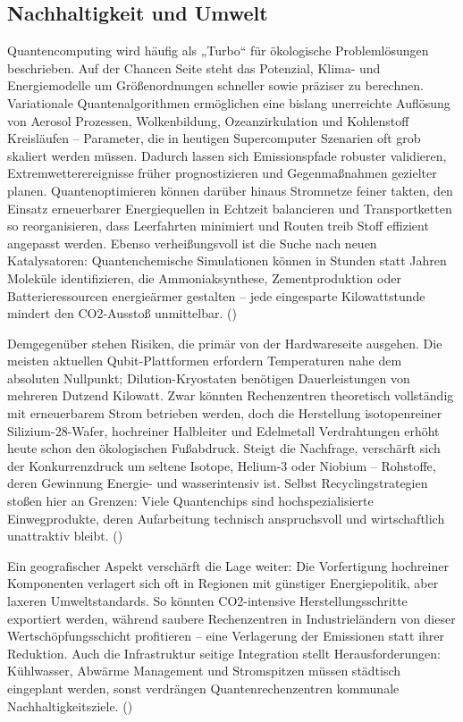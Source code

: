{\subsection{Nachhaltigkeit und Umwelt}
Quantencomputing wird häufig als „Turbo“ für ökologische Problemlösungen beschrieben. Auf der Chancen Seite steht das Potenzial, Klima- und Energiemodelle um Größenordnungen schneller sowie präziser zu berechnen. Variationale Quantenalgorithmen ermöglichen eine bislang unerreichte Auflösung von Aerosol Prozessen, Wolkenbildung, Ozeanzirkulation und Kohlenstoff Kreisläufen – Parameter, die in heutigen Supercomputer Szenarien oft grob skaliert werden müssen. Dadurch lassen sich Emissionspfade robuster validieren, Extremwetterereignisse früher prognostizieren und Gegenmaßnahmen gezielter planen. Quantenoptimieren können darüber hinaus Stromnetze feiner takten, den Einsatz erneuerbarer Energiequellen in Echtzeit balancieren und Transportketten so reorganisieren, dass Leerfahrten minimiert und Routen treib Stoff effizient angepasst werden. Ebenso verheißungsvoll ist die Suche nach neuen Katalysatoren: Quantenchemische Simulationen können in Stunden statt Jahren Moleküle identifizieren, die Ammoniaksynthese, Zementproduktion oder Batterieressourcen energieärmer gestalten – jede eingesparte Kilowattstunde mindert den CO2-Ausstoß unmittelbar. (\cite{schwabeOpportunitiesChallengesQuantum2025a})

Demgegenüber stehen Risiken, die primär von der Hardwareseite ausgehen. Die meisten aktuellen Qubit-Plattformen erfordern Temperaturen nahe dem absoluten Nullpunkt; Dilution-Kryostaten benötigen Dauerleistungen von mehreren Dutzend Kilowatt. Zwar könnten Rechenzentren theoretisch vollständig mit erneuerbarem Strom betrieben werden, doch die Herstellung isotopenreiner Silizium-28-Wafer, hochreiner Halbleiter und Edelmetall Verdrahtungen erhöht heute schon den ökologischen Fußabdruck. Steigt die Nachfrage, verschärft sich der Konkurrenzdruck um seltene Isotope, Helium-3 oder Niobium – Rohstoffe, deren Gewinnung Energie- und wasserintensiv ist. Selbst Recyclingstrategien stoßen hier an Grenzen: Viele Quantenchips sind hochspezialisierte Einwegprodukte, deren Aufarbeitung technisch anspruchsvoll und wirtschaftlich unattraktiv bleibt. (\cite{rootQuantumTechnologiesContext2025})

Ein geografischer Aspekt verschärft die Lage weiter: Die Vorfertigung hochreiner Komponenten verlagert sich oft in Regionen mit günstiger Energiepolitik, aber laxeren Umweltstandards. So könnten CO2-intensive Herstellungsschritte exportiert werden, während saubere Rechenzentren in Industrieländern von dieser Wertschöpfungsschicht profitieren – eine Verlagerung der Emissionen statt ihrer Reduktion. Auch die Infrastruktur seitige Integration stellt Herausforderungen: Kühlwasser, Abwärme Management und Stromspitzen müssen städtisch eingeplant werden, sonst verdrängen Quantenrechenzentren kommunale Nachhaltigkeitsziele. (\cite{rootQuantumTechnologiesContext2025})

}
